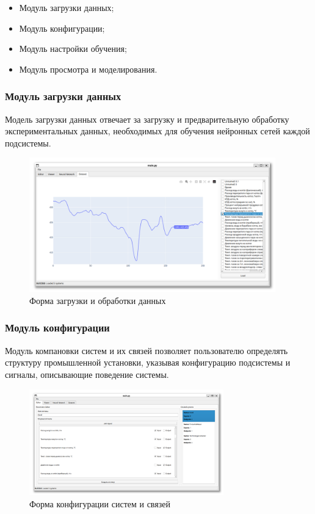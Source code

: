 \begin{itemize}
  \item Модуль загрузки данных;
  \item Модуль конфигурации;
  \item Модуль настройки обучения;
  \item Модуль просмотра и моделирования.
\end{itemize}

\subsubsection{Модуль загрузки данных}

Модель загрузки данных отвечает за загрузку и предварительную обработку
экспериментальных данных, необходимых для обучения нейронных сетей каждой
подсистемы. 

\begin{figure}[H]
  \begin{center}
    \includegraphics[width=0.95\textwidth]{figures/modules/loader.png}
  \end{center}
  \caption{Форма загрузки и обработки данных}\label{fig:forms:loader}
\end{figure}

\subsubsection{Модуль конфигурации}

Модуль компановки систем и их связей позволяет пользователю определять структуру
промышленной установки, указывая конфигурацию подсистемы и сигналы, описывающие
поведение системы. 

\begin{figure}[H]
  \begin{center}
    \includegraphics[width=0.75\textwidth]{figures/modules/editor.png}
  \end{center}
  \caption{Форма конфигурации систем и связей}\label{fig:forms:editor}
\end{figure}

